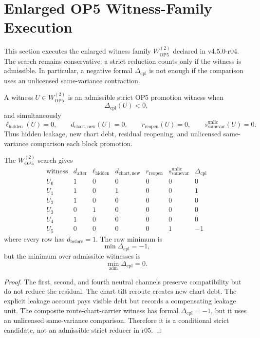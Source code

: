 
\section{Enlarged OP5 Witness-Family Execution}
\label{sec:v450-r05-execute-enlarged-op5-witness-family}

This section executes the enlarged witness family \(W_{\mathrm{OP5}}^{(2)}\)
declared in v4.5.0-r04.  The search remains conservative: a strict reduction
counts only if the witness is admissible.  In particular, a negative formal
\(\Delta_{\mathrm{cpl}}\) is not enough if the comparison uses an unlicensed
same-variance contraction.

\begin{definition}
A witness \(U\in W_{\mathrm{OP5}}^{(2)}\) is an admissible strict OP5
promotion witness when
\[
    \Delta_{\mathrm{cpl}}(U)<0,
\]
and simultaneously
\[
    \ell_{\mathrm{hidden}}(U)=0,\qquad
    d_{\mathrm{chart,new}}(U)=0,\qquad
    r_{\mathrm{reopen}}(U)=0,\qquad
    s_{\mathrm{samevar}}^{\mathrm{unlic}}(U)=0.
\]
Thus hidden leakage, new chart debt, residual reopening, and unlicensed
same-variance comparison each block promotion.
\end{definition}

\begin{proposition}
The \(W_{\mathrm{OP5}}^{(2)}\) search gives
\[
\begin{array}{c|r|r|r|r|r|r}
\text{witness} & d_{\mathrm{after}} & \ell_{\mathrm{hidden}} &
d_{\mathrm{chart,new}} & r_{\mathrm{reopen}} &
s_{\mathrm{samevar}}^{\mathrm{unlic}} & \Delta_{\mathrm{cpl}}\\
\hline
U_0 & 1 & 0 & 0 & 0 & 0 & 0\\
U_1 & 1 & 0 & 1 & 0 & 0 & 1\\
U_2 & 1 & 0 & 0 & 0 & 0 & 0\\
U_3 & 0 & 1 & 0 & 0 & 0 & 0\\
U_4 & 1 & 0 & 0 & 0 & 0 & 0\\
U_5 & 0 & 0 & 0 & 0 & 1 & -1
\end{array}
\]
where every row has \(d_{\mathrm{before}}=1\).
The raw minimum is
\[
    \min \Delta_{\mathrm{cpl}} = -1,
\]
but the minimum over admissible witnesses is
\[
    \min_{\mathrm{adm}}\Delta_{\mathrm{cpl}} = 0.
\]
\end{proposition}

\begin{proof}
The first, second, and fourth neutral channels preserve compatibility but do
not reduce the residual.  The chart-tilt reroute creates new chart debt.  The
explicit leakage account pays visible debt but records a compensating leakage
unit.  The composite route-chart-carrier witness has formal
\(\Delta_{\mathrm{cpl}}=-1\), but it uses an unlicensed same-variance
comparison.  Therefore it is a conditional strict candidate, not an admissible
strict reducer in r05.
\end{proof}

